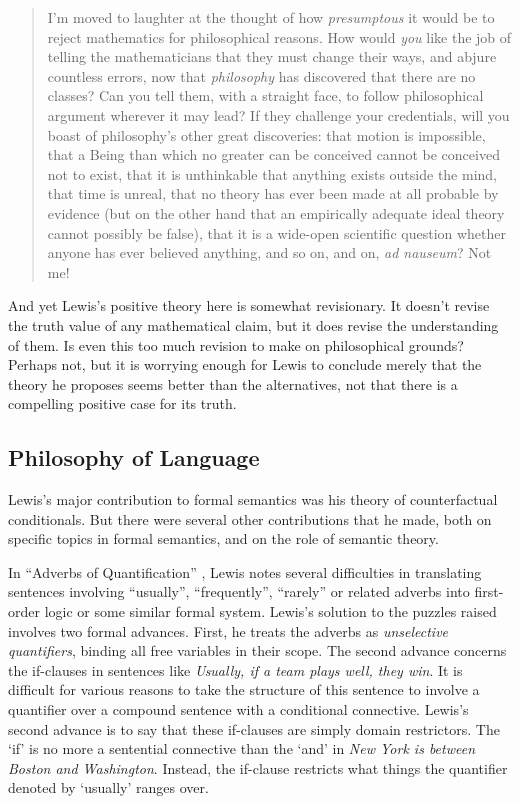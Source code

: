 \begin{quote}I'm moved to laughter at the thought of how \textit{presumptous} it would be to reject mathematics for philosophical reasons. How would \textit{you} like the job of telling the mathematicians that they must change their ways, and abjure countless errors, now that \textit{philosophy} has discovered that there are no classes? Can you tell them, with a straight face, to follow philosophical argument wherever it may lead? If they challenge your credentials, will you boast of philosophy's other great discoveries: that motion is impossible, that a Being than which no greater can be conceived cannot be conceived not to exist, that it is unthinkable that anything exists outside the mind, that time is unreal, that no theory has ever been made at all probable by evidence (but on the other hand that an empirically adequate ideal theory cannot possibly be false), that it is a wide-open scientific question whether anyone has ever believed anything, and so on, and on, \textit{ad nauseum}? Not me! \citeyearpar[59]{Lewis1991a}
\end{quote}

And yet Lewis's positive theory here is somewhat revisionary. It doesn't revise the truth value of any mathematical claim, but it does revise the understanding of them. Is even this too much revision to make on philosophical grounds? Perhaps not, but it is worrying enough for Lewis to conclude merely that the theory he proposes seems better than the alternatives, not that there is a compelling positive case for its truth.

\subsection{Philosophy of Language} 
Lewis's major contribution to formal semantics was his theory of counterfactual conditionals. But there were several other contributions that he made, both on specific topics in formal semantics, and on the role of semantic theory.

In ``Adverbs of Quantification'' \citeyearpar{Lewis1975a}, Lewis notes several difficulties in translating sentences involving ``usually'', ``frequently'', ``rarely'' or related adverbs into first-order logic or some similar formal system. Lewis's solution to the puzzles raised involves two formal advances. First, he treats the adverbs as \textit{unselective quantifiers}, binding all free variables in their scope. The second advance concerns the if-clauses in sentences like \textit{Usually, if a team plays well, they win}. It is difficult for various reasons to take the structure of this sentence to involve a quantifier over a compound sentence with a conditional connective. Lewis's second advance is to say that these if-clauses are simply domain restrictors. The `if' is no more a sentential connective than the `and' in \textit{New York is between Boston and Washington}. Instead, the if-clause restricts what things the quantifier denoted by `usually' ranges over.

